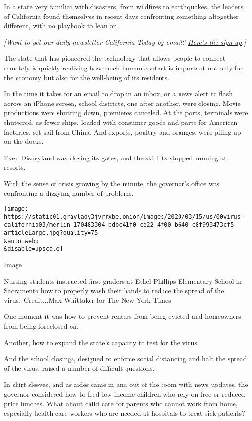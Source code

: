 In a state very familiar with disasters, from wildfires to earthquakes,
the leaders of California found themselves in recent days confronting
something altogether different, with no playbook to lean on.

\emph{{[}Want to get our daily newsletter California Today by email?}
\href{http://www.nytimes3xbfgragh.onion/newsletters/california-today}{\emph{Here's
the sign-up}}\emph{.{]}}

The state that has pioneered the technology that allows people to
connect remotely is quickly realizing how much human contact is
important not only for the economy but also for the well-being of its
residents.

In the time it takes for an email to drop in an inbox, or a news alert
to flash across an iPhone screen, school districts, one after another,
were closing. Movie productions were shutting down, premieres canceled.
At the ports, terminals were shuttered, as fewer ships, loaded with
consumer goods and parts for American factories, set sail from China.
And exports, poultry and oranges, were piling up on the docks.

Even Disneyland was closing its gates, and the ski lifts stopped running
at resorts.

With the sense of crisis growing by the minute, the governor's office
was confronting a dizzying number of problems.

\texttt{[image: https://static01.graylady3jvrrxbe.onion/images/2020/03/15/us/00virus-california03/merlin\_170483304\_bdbc41f0-ce22-4f00-b640-c8f993473cf5-articleLarge.jpg?quality=75\\\&auto=webp\\\&disable=upscale]}

Image

Nursing students instructed first graders at Ethel Phillips Elementary
School in Sacramento how to properly wash their hands to reduce the
spread of the virus.~Credit...Max Whittaker for The New York Times

One moment it was how to prevent renters from being evicted and
homeowners from being foreclosed on.

Another, how to expand the state's capacity to test for the virus.

And the school closings, designed to enforce social distancing and halt
the spread of the virus, raised a number of difficult questions.

In shirt sleeves, and as aides came in and out of the room with news
updates, the governor considered how to feed low-income children who
rely on free or reduced-price lunches. What about child care for parents
who cannot work from home, especially health care workers who are needed
at hospitals to treat sick patients?

